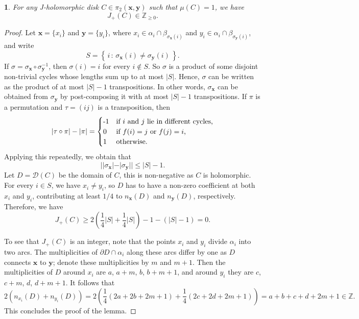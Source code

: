 \documentclass[11pt,oneside,english]{amsart}
\numberwithin{equation}{section}
\numberwithin{figure}{section}
\theoremstyle{definition}
\theoremstyle{plain}
\theoremstyle{plain}
\newtheorem{lem}[thm]{\protect\lemmaname}
\theoremstyle{remark}
\theoremstyle{plain}
\providecommand{\lemmaname}{Lemma}
\begin{document}
\begin{lem} \label{lem:jplus}
For any J-holomorphic disk $C \in \pi_2({\mathbf{x}},{\mathbf{y}})$
such that $\mu(C)=1$, we have
\[
J_{+}(C) \in {\mathbb{Z}}_{\ge 0}.
\]
\end{lem}

\begin{proof}
Let $\mathbf{x}=\{x_{i}\}$ and $\mathbf{y}=\{y_{i}\}$,
where $x_{i} \in \alpha_{i} \cap \beta_{\sigma_{\mathbf{x}}(i)}$ and
$y_{i} \in \alpha_{i} \cap \beta_{\sigma_{\mathbf{y}}(i)}$, and write
\[
S = \left\{\, i\,\colon\,\sigma_{\mathbf{x}}(i)\ne\sigma_{\mathbf{y}}(i) \,\right\}.
\]
If $\sigma = \sigma_{\mathbf{x}} \circ \sigma_{\mathbf{y}}^{-1}$, then $\sigma(i) = i$ for every $i \not\in S$.
So $\sigma$ is a product of some disjoint non-trivial cycles whose lengths sum up to at most $|S|$.
Hence, $\sigma$ can be written as the product of at most $|S|-1$ transpositions.
In other words, $\sigma_{\mathbf{x}}$ can be obtained from $\sigma_{\mathbf{y}}$ by post-composing it with at most $|S|-1$
transpositions. If $\pi$ is a permutation and $\tau = (ij)$ is a transposition, then
\[
|\tau \circ \pi| - |\pi| =
\begin{cases}
$-1$ & \mbox{if $i$ and $j$ lie in different cycles,} \\
0 & \mbox{if $f(i) = j$ or $f(j) = i$,} \\
1 & \mbox{otherwise.}
\end{cases}
\]
Applying this repeatedly, we obtain that
\[
||\sigma_{\mathbf{x}}|-|\sigma_{\mathbf{y}}|| \le |S|-1.
\]
Let $D={\mathcal{D}}(C)$ be the domain of $C$, this is non-negative as $C$ is holomorphic.
For every $i \in S$, we have $x_i \neq y_i$,
so $D$ has to have a non-zero coefficient at both $x_i$ and $y_i$,
contributing at least $1/4$ to $n_{\mathbf{x}}(D)$ and $n_{\mathbf{y}}(D)$, respectively.
Therefore, we have
\[
J_{+}(C)\ge  2\left(\frac14 |S| + \frac14 |S|\right) -1 - (|S| - 1) = 0.
\]

To see that $J_+(C)$ is an integer, note that the points $x_i$ and $y_i$
divide ${\alpha}_i$ into two arcs. The multiplicities of $\partial D \cap {\alpha}_i$
along these arcs differ by one as $D$ connects ${\mathbf{x}}$ to ${\mathbf{y}}$; denote these multiplicities
by $m$ and $m+1$. Then the multiplicities of $D$ around $x_i$ are $a$, $a+m$, $b$, $b+m+1$,
and around $y_i$ they are $c$, $c+m$, $d$, $d+m+1$. It follows that
\[
2\left(n_{x_i}(D)+n_{y_i}(D)\right) = 2\left(\frac14 (2a+2b+2m+1) + \frac14(2c+2d+2m+1) \right) = a+b+c+d+2m+1 \in {\mathbb{Z}}.
\]
This concludes the proof of the lemma.
\end{proof}
\end{document}

